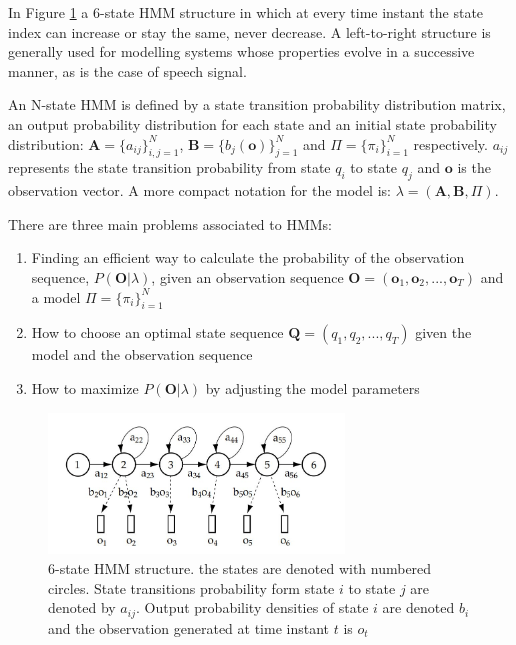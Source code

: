In Figure \ref{fig:hmm_structure} a 6-state HMM structure in which at every time instant the state index can increase or stay the same, never decrease. 
%
A left-to-right structure is generally used for modelling systems whose properties evolve in a successive manner, as is the case of speech signal.

An N-state HMM is defined by a state transition probability distribution matrix, an output probability distribution for each state and an initial state probability distribution: $\mathbf{A} = \lbrace a_{ij}\rbrace _{i,j=1}^{N}$, $\mathbf{B} = \lbrace b_{j}(\mathbf{o})\rbrace _{j=1}^{N}$ and $\Pi = \lbrace \pi _{i} \rbrace _{i=1}^{N}$ respectively.
% 
$a_{ij}$ represents the state transition probability from state $q_{i}$ to state $q_{j}$ and $\mathbf{o}$ is the observation vector. A more compact notation for the model is: $\lambda = (\mathbf{A},\mathbf{B},\Pi)$.

There are three main problems associated to HMMs:
\begin{enumerate}
	\item Finding an efficient way to calculate the probability of the observation sequence, $P(\mathbf{O}|\lambda)$, given an observation sequence $\mathbf{O} = (\mathbf{o}_{1},\mathbf{o}_{2},...,\mathbf{o}_{T})$ and a model $\Pi = \lbrace \pi _{i} \rbrace _{i=1}^{N}$
	\item How to choose an optimal state sequence $\mathbf{Q} = (q_{1},q_{2},...,q_{T})$ given the model and the observation sequence
	\item How to maximize $P(\mathbf{O}|\lambda)$ by adjusting the model parameters
\end{enumerate}

\begin{figure}[!htb]
\begin{centering}
\includegraphics[width=0.7\textwidth]{images/hmm_structure.jpg}
\caption{6-state HMM structure. the states are denoted with numbered circles. State transitions probability form state $i$ to state $j$ are denoted by $a_{ij}$. Output probability densities of state $i$ are denoted $b_{i}$ and the observation generated at time instant $t$ is $o_{t}$ \cite{karjalainen1999kommunikaatioakustiikka}}
\label{fig:hmm_structure}
\end{centering}
\end{figure}

